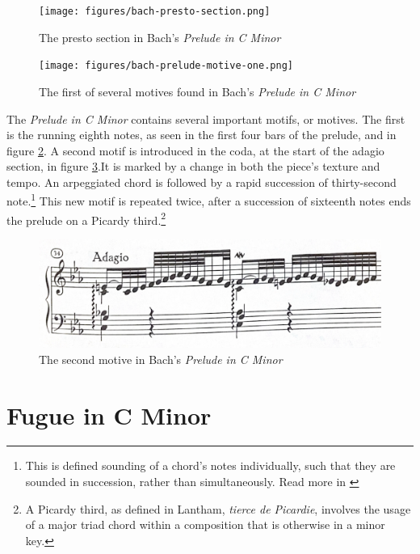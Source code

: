 \begin{figure}
    \centering
    \texttt{[image: figures/bach-presto-section.png]}
    \caption{The presto section in Bach's \textit{Prelude in C Minor}}
    \label{fig:bach-presto-section}
\end{figure}

\begin{figure}
    \centering
    \texttt{[image: figures/bach-prelude-motive-one.png]}
    \caption{The first of several motives found in Bach's \textit{Prelude in C Minor}}
    \label{fig:bach-first-motive}
\end{figure}

The \textit{Prelude in C Minor} contains several important motifs, or motives. The first is the running eighth notes, as seen in the first four bars of the prelude, and in figure \ref{fig:bach-first-motive}\autocite{Henle_2009}. A second motif is introduced in the coda, at the start of the adagio section, in figure \ref{fig:bach-second-motive}\autocite{Henle_2009}.It is marked by a change in both the piece's texture and tempo. An arpeggiated chord is followed by a rapid succession of thirty-second note.\footnote{This is defined sounding of a chord's notes individually, such that they are sounded in succession, rather than simultaneously. Read more in \cite{Arpeggio_2001}} This new motif is repeated twice, after a succession of sixteenth notes ends the prelude on a Picardy third.\footnote{A Picardy third, as defined in Lantham, \textit{tierce de Picardie}, involves the usage of a major triad chord within a composition that is otherwise in a minor key.}
\begin{figure}
    \centering
    \includegraphics[width=\textwidth]{figures/bach-prelude-second-motive.png}
    \caption{The second motive in Bach's \textit{Prelude in C Minor}}
    \label{fig:bach-second-motive}
\end{figure}

\section{Fugue in C Minor}

